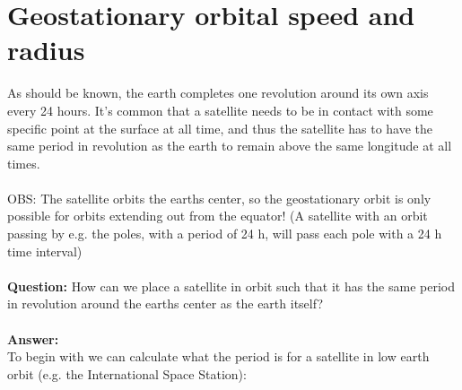 \documentclass{article}
\begin{document}
\section*{Geostationary orbital speed and radius}
As should be known, the earth completes one revolution around its own axis every 24 hours. It's common that a satellite needs to be in contact with some specific point at the surface at all time, and thus the satellite has to have the same period in revolution as the earth to remain above the same longitude at all times. 
\\ \\
OBS: The satellite orbits the earths center, so the geostationary orbit is only possible for orbits extending out from the equator! (A satellite with an orbit passing by e.g. the poles, with a period of 24 h, will pass each pole with a 24 h time interval)
\\ \\
\textbf{Question:} How can we place a satellite in orbit such that it has the same period in revolution around the earths center as the earth itself?
\\ \\
\textbf{Answer:}
\\
To begin with we can calculate what the period is for a satellite in low earth orbit (e.g. the International Space Station):
\end{document}
